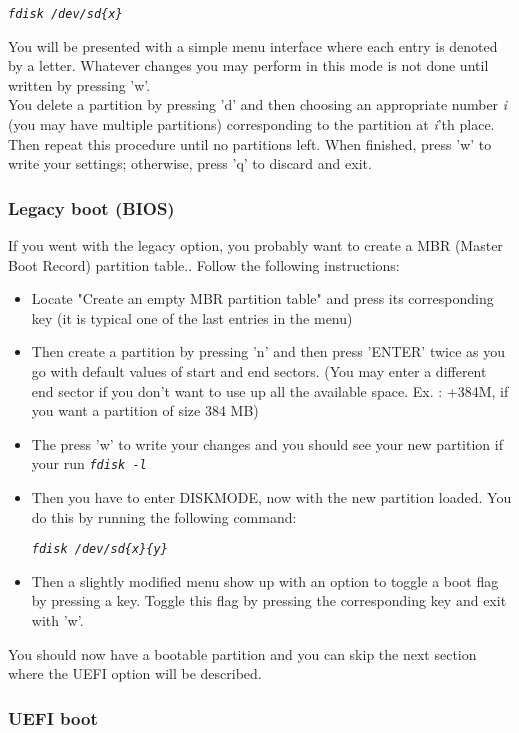 \documentclass{article}
\newcommand{\code}[1]{\begin{center}
		\textit{\texttt{#1}}
\end{center}}
\newcommand{\inlineCode}[1]{\textit{\texttt{#1}}}
\begin{document}
	 \code{fdisk /dev/sd\{x\}}
	 
	 You will be presented with a simple menu interface where each entry is denoted by a letter. Whatever changes you may perform in this mode is not done until written by pressing 'w'.\\
	 
	 You delete a partition by pressing 'd' and then choosing an appropriate number \textit{i} (you may have multiple partitions) corresponding to the partition at \textit{i}'th place. Then repeat this procedure until no partitions left. When finished, press 'w' to write your settings; otherwise, press 'q' to discard and exit. 
	 
	 \subsubsection{Legacy boot (BIOS)}
	 
	 If you went with the legacy option, you probably want to create a MBR (Master Boot Record) partition table.. Follow the following instructions:
	 \begin{itemize}
	 	\item Locate "Create an empty MBR partition table" and press its corresponding key (it is typical one of the last entries in the menu)
	 	\item Then create a partition by pressing 'n' and then press 'ENTER' twice as you go with default values of start and end sectors. (You may enter a different end sector if you don't want to use up all the available space. Ex. : +384M, if you want a partition of size 384 MB)
	 	\item The press 'w' to write your changes and you should see your new partition if your run \inlineCode{fdisk -l}
	 	\item Then you have to enter DISKMODE, now with the new partition loaded. You do this by running the following command:
	 	\code{fdisk /dev/sd\{x\}\{y\}}
	 	\item Then a slightly modified menu show up with an option to toggle a boot flag by pressing a key. Toggle this flag by pressing the corresponding key and exit with 'w'. 	
	 \end{itemize}
 	 
 	 You should now have a bootable partition and you can skip the next section where the UEFI option will be described.
 	 \subsubsection{UEFI boot}
 	 
\end{document}
